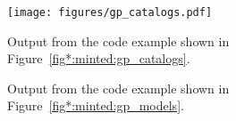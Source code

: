 \documentclass[longauth]{aa}
\begin{document}
\begin{figure*}[!ht]
        \centering
        \texttt{[image: figures/gp\_catalogs.pdf]}
        \caption{Output from the code example shown in Figure~\ref{fig*:minted:gp_catalogs}.}
        \label{fig:code_example_gp_catalogs}
\end{figure*}

\begin{figure}[!ht]
        \small
        \caption{Output from the code example shown in Figure~\ref{fig*:minted:gp_models}.}
        \label{fig:code_example_gp_models}
\end{figure}
\end{document}

